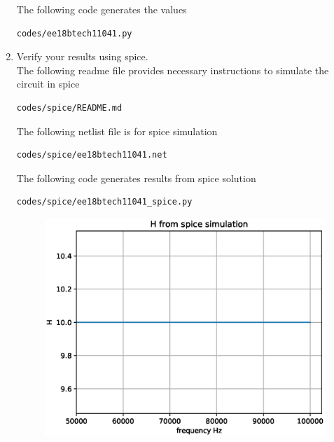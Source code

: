 \begin{enumerate}[label=\arabic*.,ref=\theenumi]
%
% 

    
The following code generates the values
\begin{lstlisting}
codes/ee18btech11041.py
\end{lstlisting}

\item Verify your results using spice.
\\
\solution
The following readme file provides necessary instructions to simulate the circuit in spice

\begin{lstlisting}
codes/spice/README.md
\end{lstlisting}

The following netlist file is for spice simulation
\begin{lstlisting}
codes/spice/ee18btech11041.net
\end{lstlisting}

The following code generates results from spice solution

\begin{lstlisting}
codes/spice/ee18btech11041_spice.py
\end{lstlisting}

\begin{figure}[!ht]
\centering
\includegraphics[width=\columnwidth]{./figs/H.eps}
\caption{}
\label{fig:ee18btech11041_fig8}
\end{figure}



\end{enumerate}
